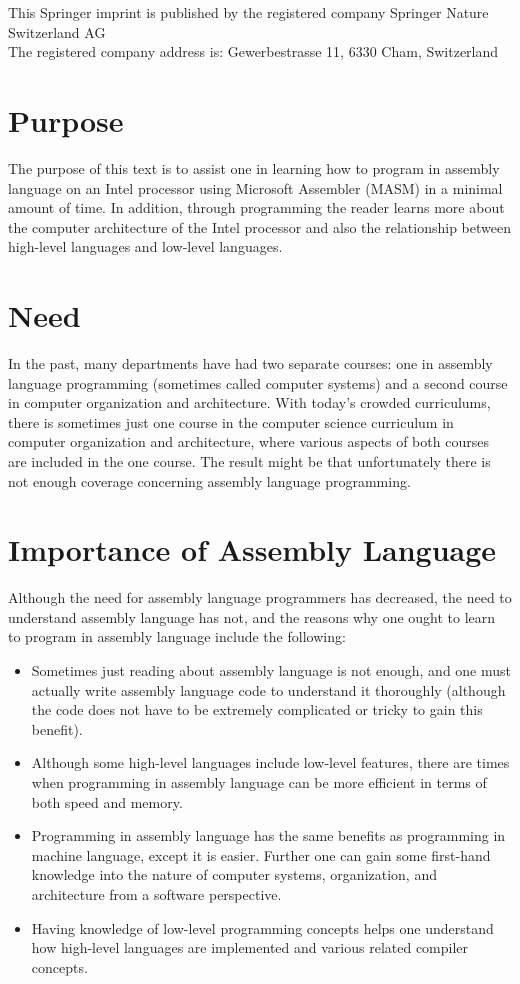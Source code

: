 \documentclass[10pt]{book}
\begin{document}
This Springer imprint is published by the registered company Springer Nature Switzerland AG\\
The registered company address is: Gewerbestrasse 11, 6330 Cham, Switzerland
\section{Purpose}
The purpose of this text is to assist one in learning how to program in assembly language on an Intel processor using Microsoft Assembler (MASM) in a minimal amount of time. In addition, through programming the reader learns more about the computer architecture of the Intel processor and also the relationship between high-level languages and low-level languages.

\section{Need}
In the past, many departments have had two separate courses: one in assembly language programming (sometimes called computer systems) and a second course in computer organization and architecture. With today's crowded curriculums, there is sometimes just one course in the computer science curriculum in computer organization and architecture, where various aspects of both courses are included in the one course. The result might be that unfortunately there is not enough coverage concerning assembly language programming.

\section{Importance of Assembly Language}
Although the need for assembly language programmers has decreased, the need to understand assembly language has not, and the reasons why one ought to learn to program in assembly language include the following:
\begin{itemize}
\item Sometimes just reading about assembly language is not enough, and one must actually write assembly language code to understand it thoroughly (although the code does not have to be extremely complicated or tricky to gain this benefit).
\item Although some high-level languages include low-level features, there are times when programming in assembly language can be more efficient in terms of both speed and memory.
\item Programming in assembly language has the same benefits as programming in machine language, except it is easier. Further one can gain some first-hand
knowledge into the nature of computer systems, organization, and architecture from a software perspective.
  \item Having knowledge of low-level programming concepts helps one understand how high-level languages are implemented and various related compiler concepts.
\end{itemize}
\end{document}
